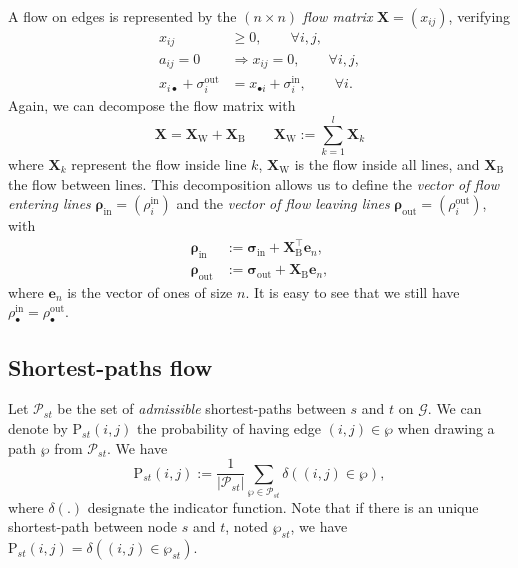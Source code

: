 \documentclass[11p]{article}
\begin{document}
A flow on edges is represented by the $(n \times n)$ \emph{flow matrix} $\mathbf{X} = (x_{ij})$, verifying
\begin{align}
x_{ij} &\geq 0, \qquad \forall i,j, \\
a_{ij} = 0 &\Rightarrow x_{ij} = 0, \qquad \forall i,j, \\ 
x_{i\bullet} + \sigma^\text{out}_i &= x_{\bullet i} + \sigma^\text{in}_i, \qquad \forall i.
\end{align}
Again, we can decompose the flow matrix with 
\begin{equation}
\mathbf{X} = \mathbf{X}_\text{W} + \mathbf{X}_\text{B} \qquad \mathbf{X}_\text{W} := \sum_{k=1}^l \mathbf{X}_k
\end{equation}
where $\mathbf{X}_k$ represent the flow inside line $k$, $\mathbf{X}_\text{W}$ is the flow inside all lines, and $\mathbf{X}_\text{B}$ the flow between lines. This decomposition allows us to define 
the \emph{vector of flow entering lines} $\bm{\rho}_\text{in} = (\rho^\text{in}_i)$ and the \emph{vector of flow leaving lines} $\bm{\rho}_\text{out} = (\rho^\text{out}_i)$, with
\begin{align}
\bm{\rho}_\text{in} &:= \bm{\sigma}_\text{in} + \mathbf{X}^\top_\text{B} \mathbf{e}_n, \\
\bm{\rho}_\text{out} &:= \bm{\sigma}_\text{out} + \mathbf{X}_\text{B} \mathbf{e}_n,
\end{align}
where $\mathbf{e}_n$ is the vector of ones of size $n$. It is easy to see that we still have $\rho^\text{in}_\bullet = \rho^\text{out}_\bullet$. \\

\subsection{Shortest-paths flow}

Let $\mathcal{P}_{st}$ be the set of \emph{admissible} shortest-paths between $s$ and $t$ on $\mathcal{G}$. We can denote by $\text{P}_{st}(i, j)$ the probability of having edge $(i, j) \in \wp$ when drawing a path $\wp$ from $\mathcal{P}_{st}$. We have 
\begin{equation}
\text{P}_{st}(i, j) := \frac{1}{|\mathcal{P}_{st}|}\sum_{\wp \in \mathcal{P}_{st}} \delta((i, j) \in \wp),
\end{equation}
where $\delta(.)$ designate the indicator function. Note that if there is an unique shortest-path between node $s$ and $t$, noted $\wp_{st}$, we have $\text{P}_{st}(i, j) = \delta((i, j) \in \wp_{st})$. \\
\end{document}
